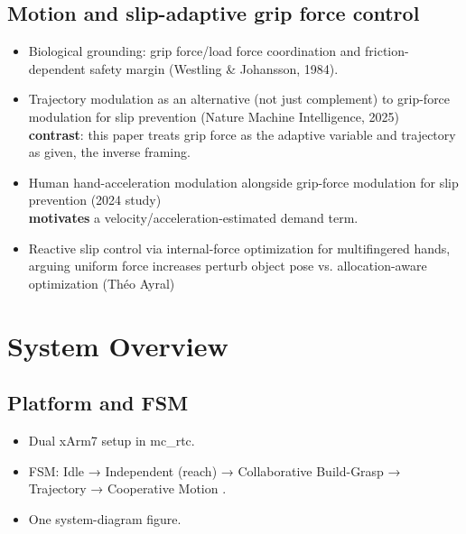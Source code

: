 \documentclass[conference]{IEEEtran}
\begin{document}
\subsection{Motion and slip-adaptive grip force control}
\begin{itemize}
    \item Biological grounding: grip force/load force coordination and friction-dependent safety margin (Westling \& Johansson, 1984).
    \item Trajectory modulation as an alternative (not just complement) to grip-force modulation for slip prevention (Nature Machine Intelligence, 2025)  \\ \textbf{contrast}: this paper treats grip force as the adaptive variable and trajectory as given, the inverse framing.
    \item Human hand-acceleration modulation alongside grip-force modulation for slip prevention (2024 study) \\  \textbf{motivates} a velocity/acceleration-estimated demand term.
    \item Reactive slip control via internal-force optimization for multifingered hands, arguing uniform force increases perturb object pose vs. allocation-aware optimization (Théo Ayral)
\end{itemize}



\section{System Overview}
\subsection{Platform and FSM}
\begin{itemize}
    \item Dual xArm7 setup in mc\_rtc.
    \item FSM: Idle → Independent (reach) → Collaborative { Build-Grasp → Trajectory → Cooperative Motion }.
    \item One system-diagram figure.
\end{itemize}
\end{document}
